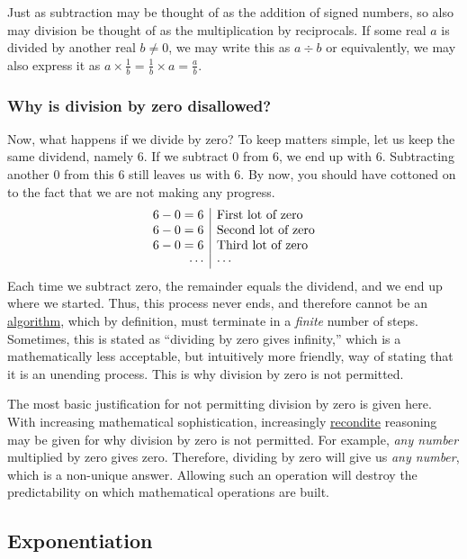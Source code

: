 \documentclass[
  a4paper,
]{article}
\begin{document}
Just as subtraction may be thought of as the addition of signed numbers,
so also may division be thought of as the multiplication by reciprocals.
If some real \(a\) is divided by another real \(b \ne 0\), we may write
this as \(a \div b\) or equivalently, we may also express it as
\(a \times \frac{1}{b} = \frac{1}{b} \times a = \frac{a}{b}\).

\hypertarget{why-is-division-by-zero-disallowed}{%
\subsubsection{Why is division by zero
disallowed?}\label{why-is-division-by-zero-disallowed}}

Now, what happens if we divide by zero? To keep matters simple, let us
keep the same dividend, namely 6. If we subtract 0 from 6, we end up
with 6. Subtracting another 0 from this 6 still leaves us with 6. By
now, you should have cottoned on to the fact that we are not making any
progress. \[
\begin{array}{r | l}
6 - 0 = 6 & \mbox{First lot of zero}\\
6 - 0 = 6 & \mbox{Second lot of zero}\\
6 - 0 = 6 & \mbox{Third lot of zero}\\
\cdots & \cdots\\
\end{array}
\] Each time we subtract zero, the remainder equals the dividend, and we
end up where we started. Thus, this process never ends, and therefore
cannot be an
\href{https://mathworld.wolfram.com/Algorithm.html}{algorithm}, which by
definition, must terminate in a \emph{finite} number of steps.
Sometimes, this is stated as ``dividing by zero gives infinity,'' which
is a mathematically less acceptable, but intuitively more friendly, way
of stating that it is an unending process. This is why division by zero
is not permitted.

The most basic justification for not permitting division by zero is
given here. With increasing mathematical sophistication, increasingly
\href{https://www.merriam-webster.com/dictionary/recondite}{recondite}
reasoning may be given for why division by zero is not permitted. For
example, \emph{any number} multiplied by zero gives zero. Therefore,
dividing by zero will give us \emph{any number}, which is a non-unique
answer. Allowing such an operation will destroy the predictability on
which mathematical operations are built.

\hypertarget{exponentiation}{%
\subsection{Exponentiation}\label{exponentiation}}
\end{document}
